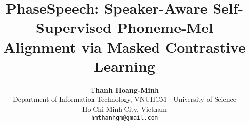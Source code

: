 \documentclass[10pt,twocolumn,letterpaper]{article}
\title{PhaseSpeech: Speaker-Aware Self-Supervised Phoneme-Mel Alignment via Masked Contrastive Learning}
\author{\textbf{Thanh Hoang-Minh \orcidlink{0009-0007-0898-5923}}\\
Department of Information Technology, VNUHCM - University of Science\\
Ho Chi Minh City, Vietnam \\
{\tt\small hmthanhgm@gmail.com}
}
\begin{document}
\maketitle
    







{
    \small
    
    
}


% 
\end{document}
